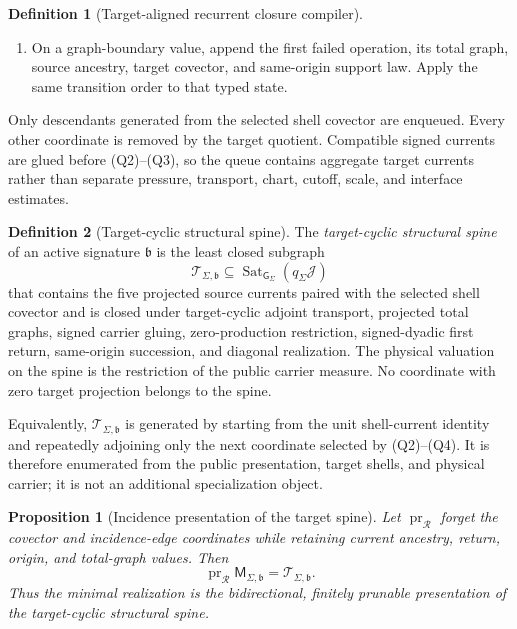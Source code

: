 \documentclass[11pt]{article}
\numberwithin{section}{part}
\theoremstyle{plain}
\newtheorem{proposition}[proposition]{Proposition}
\theoremstyle{definition}
\newtheorem{definition}[definition]{Definition}
\theoremstyle{remark}
\newcommand{\Spine}{\mathscr T}
\begin{document}
\begin{definition}[Target-aligned recurrent closure compiler]
\begin{enumerate}[label=\textup{(Q\arabic*)}]
resolved coordinates agree with those of its parent.
\item On a graph-boundary value, append the first failed operation, its total
graph, source ancestry, target covector, and same-origin support law.  Apply
the same transition order to that typed state.
\end{enumerate}
Only descendants generated from the selected shell covector are enqueued.
Every other coordinate is removed by the target quotient.  Compatible signed
currents are glued before \textup{(Q2)}--\textup{(Q3)}, so the queue contains
aggregate target currents rather than separate pressure, transport, chart,
cutoff, scale, and interface estimates.
\end{definition}

\begin{definition}[Target-cyclic structural spine]
\label{def:target-cyclic-structural-spine}
The \emph{target-cyclic structural spine} of an active signature
\(\mathfrak b\) is the least closed subgraph
\begin{equation}
 \label{eq:target-cyclic-structural-spine}
 \Spine_{\Sigma,\mathfrak b}
 \subseteq \operatorname{Sat}_{\mathsf G_\Sigma}
                  (q_\Sigma\mathscr J)
\end{equation}
that contains the five projected source currents paired with the selected
shell covector and is closed under target-cyclic adjoint transport, projected
total graphs, signed carrier gluing, zero-production restriction,
signed-dyadic first return, same-origin succession, and diagonal realization.
The physical valuation on the spine is the restriction of the public carrier
measure.  No coordinate with zero target projection belongs to the spine.

Equivalently, \(\Spine_{\Sigma,\mathfrak b}\) is generated by starting from
the unit shell-current identity and repeatedly adjoining only the next
coordinate selected by \textup{(Q2)}--\textup{(Q4)}.  It is therefore
enumerated from the public presentation, target shells, and physical carrier;
it is not an additional specialization object.
\end{definition}

\begin{proposition}[Incidence presentation of the target spine]
\label{prop:incidence-presents-target-spine}
Let \(\operatorname{pr}_{\mathscr R}\) forget the covector and incidence-edge
coordinates while retaining current ancestry, return, origin, and total-graph
values.  Then
\begin{equation}
 \label{eq:incidence-presents-target-spine}
 \operatorname{pr}_{\mathscr R}
 \mathsf M_{\Sigma,\mathfrak b}
 =\Spine_{\Sigma,\mathfrak b}.
\end{equation}
Thus the minimal realization is the bidirectional, finitely prunable
presentation of the target-cyclic structural spine.
\end{proposition}
\end{document}
